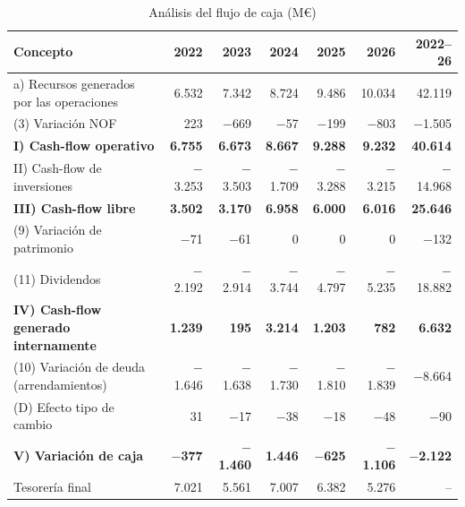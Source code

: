 \documentclass[11pt,a4paper]{article}
\newcommand{\mn}{\ensuremath{-}}                 %
\begin{document}
\begin{table}[H]
\centering
\caption{Análisis del flujo de caja (M€)}
\label{tab:fc}
\small
\begin{tabularx}{\textwidth}{@{}>{\raggedright\arraybackslash}p{4.7cm}RRRRRR@{}}
\toprule
\color{navy}\textbf{Concepto} & \color{navy}\textbf{2022} & \color{navy}\textbf{2023} & \color{navy}\textbf{2024} & \color{navy}\textbf{2025} & \color{navy}\textbf{2026} & \color{navy}\textbf{2022--26}\hspace{-2pt} \\
\midrule
a) Recursos generados por las operaciones & 6.532 & 7.342 & 8.724 & 9.486 & 10.034 & 42.119 \\
(3) Variación NOF & 223 & \mn669 & \mn57 & \mn199 & \mn803 & \mn1.505 \\
\textbf{I) Cash-flow operativo} & \textbf{6.755} & \textbf{6.673} & \textbf{8.667} & \textbf{9.288} & \textbf{9.232} & \textbf{40.614} \\
II) Cash-flow de inversiones & \mn3.253 & \mn3.503 & \mn1.709 & \mn3.288 & \mn3.215 & \mn14.968 \\
\textbf{III) Cash-flow libre} & \textbf{3.502} & \textbf{3.170} & \textbf{6.958} & \textbf{6.000} & \textbf{6.016} & \textbf{25.646} \\
(9) Variación de patrimonio & \mn71 & \mn61 & 0 & 0 & 0 & \mn132 \\
(11) Dividendos & \mn2.192 & \mn2.914 & \mn3.744 & \mn4.797 & \mn5.235 & \mn18.882 \\
\textbf{IV) Cash-flow generado internamente} & \textbf{1.239} & \textbf{195} & \textbf{3.214} & \textbf{1.203} & \textbf{782} & \textbf{6.632} \\
(10) Variación de deuda (arrendamientos) & \mn1.646 & \mn1.638 & \mn1.730 & \mn1.810 & \mn1.839 & \mn8.664 \\
(D) Efecto tipo de cambio & 31 & \mn17 & \mn38 & \mn18 & \mn48 & \mn90 \\
\textbf{V) Variación de caja} & \textbf{\mn377} & \textbf{\mn1.460} & \textbf{1.446} & \textbf{\mn625} & \textbf{\mn1.106} & \textbf{\mn2.122} \\
\midrule
Tesorería final & 7.021 & 5.561 & 7.007 & 6.382 & 5.276 & -- \\
\bottomrule
\end{tabularx}
\end{table}
\end{document}
